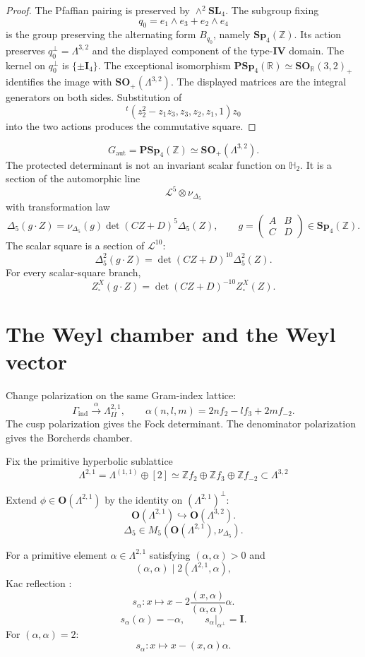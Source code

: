 \documentclass[11pt]{memoir}
\newcommand{\Z}{\mathbb{Z}} \newcommand{\C}{\mathbb{C}}
\newcommand{\R}{\mathbb{R}} \newcommand{\La}{\Lambda}
\newcommand{\HypPlan}{\Lambda^{(1,1)}}
\newcommand{\Sp}{\mathbf{Sp}}
\newcommand{\PSp}{\mathbf{PSp}}
\newcommand{\SL}{\mathbf{SL}}
\newcommand{\Orth}{\mathbf{O}}
\newcommand{\SO}{\mathbf{SO}}
\newcommand{\Hpl}{\mathbb{H}}
\newcommand{\IV}{\mathbf{IV}}
\newcommand{\Id}{\mathbf{I}}
\begin{document}
\begin{proof}
The Pfaffian pairing is preserved by $\wedge^2\SL_4$.  The subgroup
fixing
$$q_0=e_1\wedge e_3+e_2\wedge e_4$$
is the group preserving the alternating form $B_{q_0}$, namely
$\Sp_4(\Z)$.  Its action preserves $q_0^\perp=\La^{3,2}$ and the displayed
component of the type-$\IV$ domain.  The kernel on $q_0^\perp$ is
$\{\pm\Id_4\}$.  The exceptional isomorphism
$\PSp_4(\R)\simeq \SO_{\R}(3,2)_+$ identifies the image with
$\SO_+(\La^{3,2})$.  The displayed matrices are the integral generators
on both sides.  Substitution of
$${}^t(z_2^2-z_1z_3,z_3,z_2,z_1,1)z_0$$
into the two actions produces the commutative square.
\end{proof}

\begin{definition}
$$G_{\mathrm{aut}}=\PSp_4(\Z)\simeq\SO_+(\La^{3,2}).$$
The protected determinant is not an invariant scalar function on
$\Hpl_2$.  It is a section of the automorphic line
$$\mathcal L^5\otimes\nu_{\Delta_5}$$
with transformation law
$$
\Delta_5(g\cdot Z)
=\nu_{\Delta_5}(g)\det(CZ+D)^5\Delta_5(Z),
\qquad
g=\begin{pmatrix}A&B\\ C&D\end{pmatrix}\in\Sp_4(\Z).
$$
The scalar square is a section of $\mathcal L^{10}$:
$$
\Delta_5^2(g\cdot Z)=\det(CZ+D)^{10}\Delta_5^2(Z).
$$
For every scalar-square branch,
$$
Z^X_{\square}(g\cdot Z)
=\det(CZ+D)^{-10}Z^X_{\square}(Z).
$$
\end{definition}

\section{The Weyl chamber and the Weyl vector}

Change polarization on the same Gram-index lattice:
$$
\Gamma_{\mathrm{ind}}\xrightarrow{\ \alpha\ }\La^{2,1}_{II},\qquad
\alpha(n,l,m)=2nf_2-lf_3+2mf_{-2}.
$$
The cusp polarization gives the Fock determinant.  The denominator
polarization gives the Borcherds chamber.

Fix the primitive hyperbolic sublattice
$$\La^{2,1} = \HypPlan \oplus [2] \simeq \Z f_2 \oplus \Z f_3 \oplus \Z
f_{-2} \subset \La^{3,2}$$

Extend $\phi\in\Orth(\La^{2,1})$ by the identity on
$(\La^{2,1})^\perp$:
$$\Orth(\La^{2,1})\hookrightarrow\Orth(\La^{3,2}).$$
$$\Delta_5\in M_5(\Orth(\La^{2,1}),\nu_{\Delta_5}).$$

For a primitive element $\alpha \in \La^{2,1}$ satisfying
$(\alpha,\alpha)>0$ and
$$(\alpha,\alpha)\mid 2(\La^{2,1},\alpha),$$
Kac reflection \cite{KAC:1}:
$$s_{\alpha}:x\mapsto x-2\frac{(x,\alpha)}{(\alpha,\alpha)}\alpha.$$
$$s_{\alpha}(\alpha)=-\alpha,\qquad
s_{\alpha}|_{\alpha^\perp}=\Id.$$
For $(\alpha,\alpha)=2$:
$$s_{\alpha}: x \mapsto
x - (x,\alpha)\alpha.$$
\end{document}
